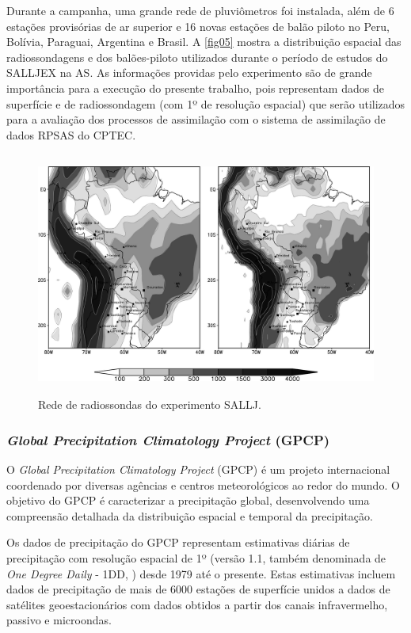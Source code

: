 Durante a campanha, uma grande rede de pluviômetros foi instalada, além de 6 estações provisórias de ar superior e 16 novas estações de balão piloto no Peru, Bolívia, Paraguai, Argentina e Brasil. A \autoref{fig05} mostra a distribuição espacial das radiossondagens e dos balões-piloto utilizados durante o período de estudos do SALLJEX na AS. As informações providas pelo experimento são de grande importância para a execução do presente trabalho, pois representam dados de superfície e de radiossondagem (com 1º de resolução espacial) que serão utilizados para a avaliação dos processos de assimilação com o sistema de assimilação de dados RPSAS do CPTEC.

\begin{figure}[!hbp]
\centering
\includegraphics[height=8cm]{./figs/rede-salljex.png}
\caption{Rede de radiossondas do experimento SALLJ.}
\label{fig05}
\end{figure}

\subsubsection{\textit{Global Precipitation Climatology Project} (GPCP)}

O \textit{Global Precipitation Climatology Project} (GPCP) \cite{wcrp86} é um projeto internacional coordenado por diversas agências e centros meteorológicos ao redor do mundo. O objetivo do GPCP é caracterizar a precipitação global, desenvolvendo uma compreensão detalhada da distribuição espacial e temporal da precipitação.

Os dados de precipitação do GPCP representam estimativas diárias de precipitação com resolução espacial de 1º (versão 1.1, também denominada de \textit{One Degree Daily} - 1DD, \cite{huffmanetal97}) desde 1979 até o presente. Estas estimativas incluem dados de precipitação de mais de 6000 estações de superfície unidos a dados de satélites geoestacionários com dados obtidos a partir dos canais  infravermelho, passivo e microondas.

